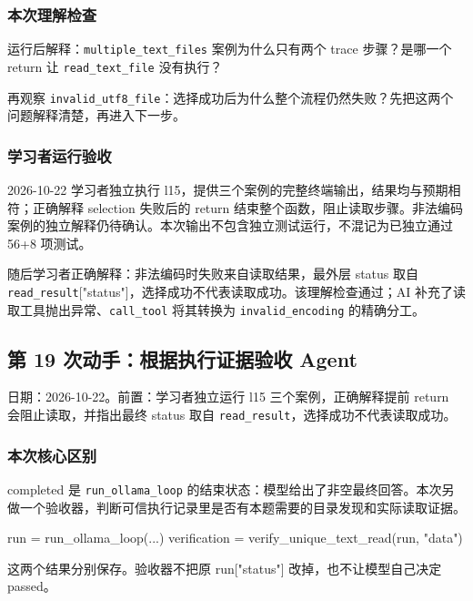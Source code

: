 \subsubsection{本次理解检查}

运行后解释：\nolinkurl{multiple_text_files} 案例为什么只有两个 trace 步骤？是哪一个 return 让 \nolinkurl{read_text_file} 没有执行？

再观察 \nolinkurl{invalid_utf8_file}：选择成功后为什么整个流程仍然失败？先把这两个问题解释清楚，再进入下一步。

\subsubsection{学习者运行验收}

2026-10-22 学习者独立执行 l15，提供三个案例的完整终端输出，结果均与预期相符；正确解释 selection 失败后的 return 结束整个函数，阻止读取步骤。非法编码案例的独立解释仍待确认。本次输出不包含独立测试运行，不混记为已独立通过 56+8 项测试。

随后学习者正确解释：非法编码时失败来自读取结果，最外层 status 取自 \nolinkurl{read_result}["status"]，选择成功不代表读取成功。该理解检查通过；AI 补充了读取工具抛出异常、\nolinkurl{call_tool} 将其转换为 \nolinkurl{invalid_encoding} 的精确分工。

\subsection{第 19 次动手：根据执行证据验收 Agent}

日期：2026-10-22。前置：学习者独立运行 l15 三个案例，正确解释提前 return 会阻止读取，并指出最终 status 取自 \nolinkurl{read_result}，选择成功不代表读取成功。

\subsubsection{本次核心区别}

completed 是 \nolinkurl{run_ollama_loop} 的结束状态：模型给出了非空最终回答。本次另做一个验收器，判断可信执行记录里是否有本题需要的目录发现和实际读取证据。

\begin{Code}
run = run_ollama_loop(...)
verification = verify_unique_text_read(run, "data")
\end{Code}

这两个结果分别保存。验收器不把原 run["status"] 改掉，也不让模型自己决定 passed。

